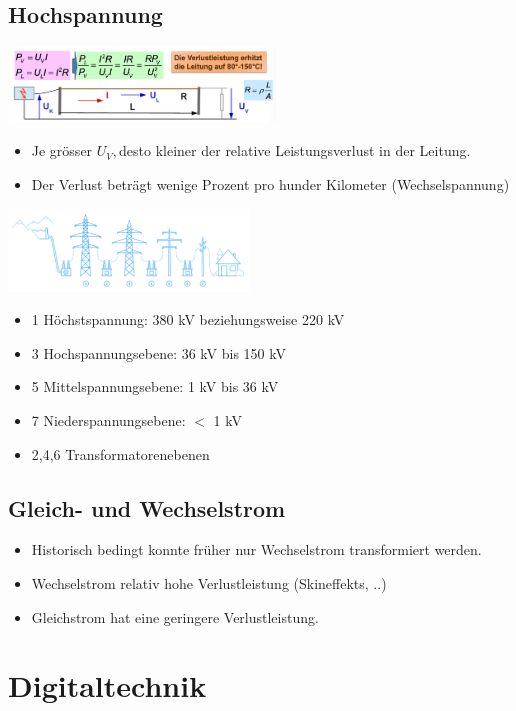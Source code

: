 \documentclass[6pt,a4paper]{scrartcl}
\begin{document}
\begin{multicols*}{4}
		\subsection{Hochspannung}
			\includegraphics[height=2cm]{img/hochspannung1.png} 
			\begin{itemize}\itemsep0pt
				\item Je grösser $U_{V}, $desto kleiner der relative Leistungsverlust in der Leitung.
				\item Der Verlust beträgt wenige Prozent pro hunder Kilometer (Wechselspannung)
			\end{itemize}
			\includegraphics[height=2.2cm]{img/hochspannung2.png} 
			\begin{itemize}\itemsep0pt
				\item 1 Höchstspannung: 380 kV beziehungsweise 220 kV 
				\item 3 Hochspannungsebene: 36 kV bis 150 kV
				\item 5 Mittelspannungsebene: 1 kV bis 36 kV
				\item 7 Niederspannungsebene: $<$ 1 kV 
				\item 2,4,6 Transformatorenebenen 
			\end{itemize}
		\subsection{Gleich- und Wechselstrom}
			\begin{itemize}\itemsep0pt
				\item Historisch bedingt konnte früher nur Wechselstrom transformiert werden. 
				\item Wechselstrom relativ hohe Verlustleistung (Skineffekts, ..)
				\item Gleichstrom hat eine geringere Verlustleistung.
			\end{itemize}

		\section{Digitaltechnik}

\end{multicols*}
\end{document}
